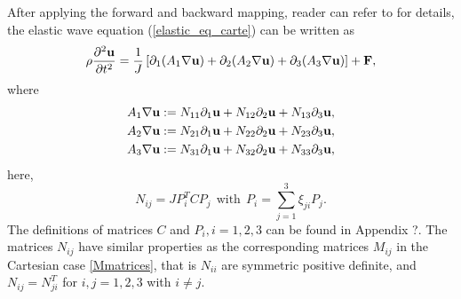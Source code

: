 After applying the forward and backward mapping, reader can refer to \cite{petersson2015wave} for details, the elastic wave equation (\ref{elastic_eq_carte}) can be written as
\begin{equation}\label{elastic_eq_curvi}
\rho\frac{\partial^2 {\bf u}}{\partial t^2} = \frac{1}{J}\left[\partial_1(A_1\nabla{\bf u}) + \partial_2(A_2\nabla{\bf u}) +\partial _3(A_3\nabla{\bf u}) \right] + {\bf F},
\end{equation}
where
\begin{align*}
A_1\nabla{\bf u} &:= N_{11}\partial_1{\bf u} + N_{12}\partial_2{\bf u} + N_{13}\partial_3{\bf u}, \\
A_2\nabla{\bf u} &:= N_{21}\partial_1{\bf u} + N_{22}\partial_2{\bf u} + N_{23}\partial_3{\bf u}, \\
A_3\nabla{\bf u} &:= N_{31}\partial_1{\bf u} + N_{32}\partial_2{\bf u} + N_{33}\partial_3{\bf u},
\end{align*}
here, 
\begin{equation}\label{definition_Nij}
N_{ij} = JP_i^TCP_j \ \ \text{with} \ \ P_i = \sum_{j=1}^3\xi_{ji}P_j.
\end{equation}
The definitions of matrices $C$ and $P_i, i = 1,2,3$ can be found in Appendix ?. The matrices $N_{ij}$ have similar properties as the corresponding matrices $M_{ij}$ in the Cartesian case \eqref{Mmatrices}, that is $N_{ii}$ are symmetric positive definite, and $N_{ij}=N_{ji}^T$ for $i,j=1,2,3$ with $i\ne j$.

